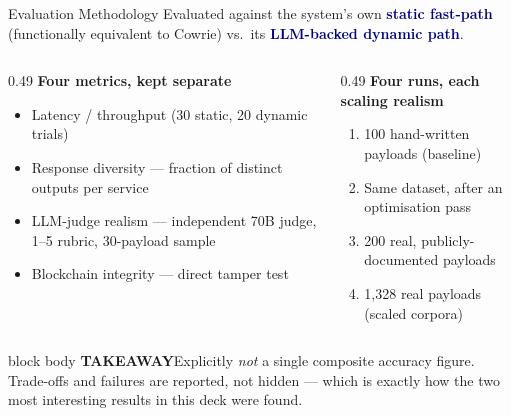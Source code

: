 \documentclass[aspectratio=169,11pt]{beamer}
\newcommand{\srcnote}[1]{\par\vspace{3pt}{\raggedleft\scriptsize\color{grayline}\itshape #1\par}}
\newcommand{\hl}[1]{\textcolor{navy}{\textbf{#1}}}
\newcommand{\takeaway}[1]{%
  \vspace{3pt}%
  \begin{beamercolorbox}[wd=\dimexpr\textwidth-10pt\relax,sep=5pt,rounded=true]{block body}%
    {\color{navy}\bfseries\scriptsize TAKEAWAY\;\;}{\scriptsize #1}%
  \end{beamercolorbox}}
\begin{document}
\begin{frame}{Evaluation Methodology}
  \small
  Evaluated against the system's own \hl{static fast-path} (functionally equivalent to Cowrie)
  vs.\ its \hl{LLM-backed dynamic path}.
  \vspace{2pt}
  \begin{columns}[T,onlytextwidth]
    \begin{column}{0.49\textwidth}
      \footnotesize\textbf{\color{navy}Four metrics, kept separate}
      \begin{itemize}\setlength\itemsep{1.5pt}\footnotesize
        \item Latency / throughput (30 static, 20 dynamic trials)
        \item Response diversity --- fraction of distinct outputs per service
        \item LLM-judge realism --- independent 70B judge, 1--5 rubric, 30-payload sample
        \item Blockchain integrity --- direct tamper test
      \end{itemize}
    \end{column}
    \begin{column}{0.49\textwidth}
      \footnotesize\textbf{\color{navy}Four runs, each scaling realism}
      \begin{enumerate}\setlength\itemsep{1.5pt}\footnotesize
        \item 100 hand-written payloads (baseline)
        \item Same dataset, after an optimisation pass
        \item 200 real, publicly-documented payloads
        \item 1{,}328 real payloads (scaled corpora)
      \end{enumerate}
    \end{column}
  \end{columns}
  \vspace{3pt}
  \takeaway{Explicitly \emph{not} a single composite accuracy figure. Trade-offs and failures are reported, not hidden --- which is exactly how the two most interesting results in this deck were found.}
  \srcnote{Paper Section IV}
\end{frame}
\end{document}
